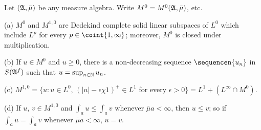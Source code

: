 

 Let $(\frak A,\bar\mu)$ be any measure algebra.
Write $M^0=M^0(\frak A,\bar\mu)$, etc.

(a) $M^0$ and $M^{1,0}$ are Dedekind complete solid linear subspaces of
$L^0$ which include $L^p$ for every $p\in\coint{1,\infty}$;  moreover,
$M^0$ is closed under multiplication.

(b) If $u\in M^0$ and $u\ge 0$, there is a
non-decreasing sequence $\sequencen{u_n}$ in $S(\frak A^f)$ such that
$u=\sup_{n\in\Bbb N}u_n$.

(c) $M^{1,0}
=\{u:u\in L^0,\,(|u|-\epsilon\chi 1)^+\in L^1$ for every $\epsilon>0\}
=L^1+(L^{\infty}\cap M^0)$.

(d) If $u$, $v\in M^{1,0}$ and $\int_au\le\int_av$ whenever
$\bar\mu a<\infty$, then $u\le v$;  so if $\int_au=\int_av$ whenever
$\bar\mu a<\infty$, $u=v$.

